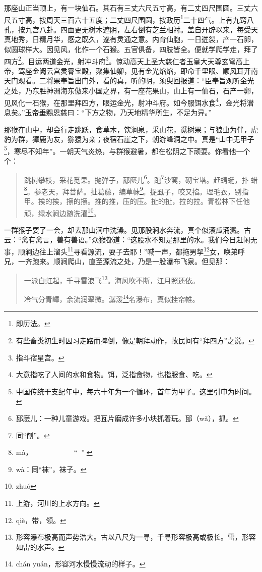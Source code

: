 \documentclass[12pt,UTF8]{ctexbook}
\begin{document}
那座山正当顶上，有一块仙石。其石有三丈六尺五寸高，有二丈四尺围圆。三丈六尺五寸高，按周天三百六十五度；二丈四尺围圆，按政历\footnote{即历法。}二十四气。上有九窍八孔，按九宫八卦。四面更无树木遮阴，左右倒有芝兰相衬。盖自开辟以来，每受天真地秀，日精月华，感之既久，遂有灵通之意。内育仙胞，一日迸裂，产一石卵，似圆球样大。因见风，化作一个石猴。五官俱备，四肢皆全。便就学爬学走，拜了四方\footnote{有些畜类初生时因习走路而摔倒，像是朝拜动作，故民间有“拜四方”之说。}。目运两道金光，射冲斗府\footnote{指斗宿星宫。}。惊动高天上圣大慈仁者玉皇大天尊玄穹高上帝，驾座金阙云宫灵霄宝殿，聚集仙卿，见有金光焰焰，即命千里眼、顺风耳开南天门观看。二将果奉旨出门外，看的真，听的明，须臾回报道：“臣奉旨观听金光之处，乃东胜神洲海东傲来小国之界，有一座花果山，山上有一仙石，石产一卵，见风化一石猴，在那里拜四方，眼运金光，射冲斗府。如今服饵水食\footnote{大意指吃了人间的水和食物。饵，泛指食物，也指服食、吃。}，金光将潜息矣。”玉帝垂赐恩慈曰：“下方之物，乃天地精华所生，不足为异。”

那猴在山中，却会行走跳跃，食草木，饮涧泉，采山花，觅树果；与狼虫为伴，虎豹为群，獐鹿为友，猕猿为亲；夜宿石崖之下，朝游峰洞之中。真是“山中无甲子\footnote{中国传统干支纪年中，每六十年为一个循环，首年为甲子。这里引申为时间。}，寒尽不知年”。一朝天气炎热，与群猴避暑，都在松阴之下顽耍。你看他一个个：

\begin{quotation}
跳树攀枝，采花觅果。抛弹子，邷麽儿\footnote{邷麽儿：一种儿童游戏。把瓦片磨成许多小块抓着玩。邷（w\v{a}），抓。}。跑\footnote{同“刨”。}沙窝，砌宝塔。赶蜻蜓，扑𧈢蜡\footnote{m\`a，𧈢蜡，北京方言，蝗虫的意思，就是蚂蚱。也作“八蜡”。}。参老天，拜菩萨。扯葛藤，编草帓\footnote{w\`a：同“袜”，袜子。}。捉虱子，咬又掐。理毛衣，剔指甲。挨的挨，擦的擦。推的推，压的压。扯的扯，拉的拉。青松林下任他顽，绿水涧边随洗濯\footnote{zhu\'o}。
\end{quotation}

一群猴子耍了一会，却去那山涧中洗澡。见那股涧水奔流，真个似滚瓜涌溅。古云：“禽有禽言，兽有兽语。”众猴都道：“这股水不知是那里的水。我们今日赶闲无事，顺涧边往上溜头\footnote{上游，河川的上水方向。}寻看源流，耍子去耶！”喊一声，都拖男挈\footnote{qi\`e，带，领。}女，唤弟呼兄，一齐跑来。顺涧爬山，直至源流之处，乃是一股瀑布飞泉。但见那：

\begin{quotation}
一派白虹起，千寻雷浪飞\footnote{形容瀑布极高而声势浩大。古以八尺为一寻，千寻形容极高或极长。雷，形容如雷的水声。}。海风吹不断，江月照还依。

冷气分青嶂，余流润翠微。潺湲\footnote{ch\'an yu\'an，形容河水慢慢流动的样子。}名瀑布，真似挂帘帷。
\end{quotation}
\end{document}
